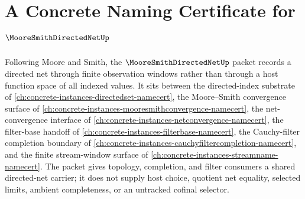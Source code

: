 \chapter{A Concrete Naming Certificate for $\MooreSmithDirectedNetUp$}
\label{ch:concrete-instances-moore-smith-directed-net-namecert}

Following Moore and Smith, the $\MooreSmithDirectedNetUp$ packet records a directed net through finite observation windows rather than through a host function space of all indexed values. It sits between the directed-index substrate of \autoref{ch:concrete-instances-directedset-namecert}, the Moore--Smith convergence surface of \autoref{ch:concrete-instances-mooresmithconvergence-namecert}, the net-convergence interface of \autoref{ch:concrete-instances-netconvergence-namecert}, the filter-base handoff of \autoref{ch:concrete-instances-filterbase-namecert}, the Cauchy-filter completion boundary of \autoref{ch:concrete-instances-cauchyfiltercompletion-namecert}, and the finite stream-window surface of \autoref{ch:concrete-instances-streamname-namecert}. The packet gives topology, completion, and filter consumers a shared directed-net carrier; it does not supply host choice, quotient net equality, selected limits, ambient completeness, or an untracked cofinal selector.

